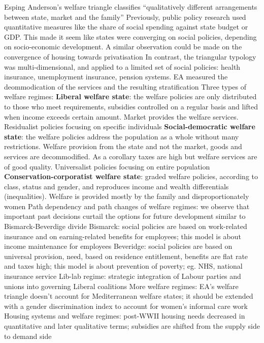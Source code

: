 \documentclass{article}
\begin{document}
\begin{outline}
	\1 Esping Anderson's welfare triangle classifies ``qualitatively different arrangements between state, market and the family''
		\2 Previously, public policy research used quantitative measures like the share of social spending against state budget or GDP. This made it seem like states were converging on social policies, depending on socio-economic development. A similar observation could be made on the convergence of housing towards privatisation
		\2 In contrast, the triangular typology was multi-dimensional, and applied to a limited set of social policies: health insurance, unemployment insurance, pension systems. EA measured the deommodication of the services and the resulting stratification
	\1 Three types of welfare regimes:
		\2 \textbf{Liberal welfare state}: the welfare policies are only distributed to those who meet requirements, subsidies controlled on a regular basis and lifted when income exceeds certain amount. Market provides the welfare services. Residualist policies focusing on specific individuals
		\2 \textbf{Social-democratic welfare state}: the welfare policies address the population as a whole without many restrictions. Welfare provision from the state and not the market, goods and services are decommodified. As a corollary taxes are high but welfare services are of good quality. Universalist policies focusing on entire population
		\2 \textbf{Conservation-corporatist welfare state}:  graded welfare policies, according to class, status and gender, and reproduces income and wealth differentials (inequalities). Welfare is provided mostly by the family and disproportionately women
	\1 Path dependency and path changes of welfare regimes: we observe that important past decisions curtail the options for future development similar to Bismarck-Beverdige divide
		\2 Bismarck: social policies are based on work-related insurance and on earning-related benefits for employees; this model is about income maintenance for employees
		\2 Beveridge: social policies are based on universal provision, need, based on residence entitlement, benefits are flat rate and taxes high; this model is about prevention of poverty; eg. NHS, national insurance service
		\2 Lib-lab regime: strategic integration of Labour parties and unions into governing Liberal coalitions
	\1 More welfare regimes: EA's welfare triangle doesn't account for Mediterranean welfare states; it should be extended with a gender discrimination index to account for women's informal care work
	\1 Housing systems and welfare regimes: post-WWII housing needs decreased in quantitative and later qualitative terms; subsidies are shifted from the supply side to demand side

\end{outline}
\end{document}
